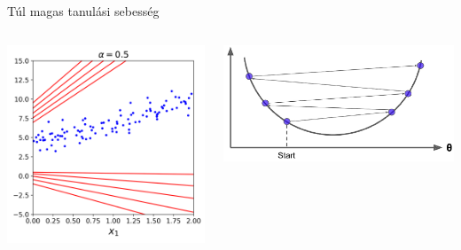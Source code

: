 \documentclass[english, aspectratio=169]{beamer}
\begin{document}
\begin{frame}{Túl magas tanulási sebesség}
	\begin{columns}
		\begin{column}{.5\textwidth}
			\begin{center}
				\includegraphics[width=6cm, keepaspectratio]{images/ql_19.png}
			\end{center}
		\end{column}
		\begin{column}{.5\textwidth}
			\begin{center}
				\includegraphics[width=7cm, keepaspectratio]{images/ql_15.png}
			\end{center}
		\end{column}
	\end{columns}
\end{frame}
\end{document}

